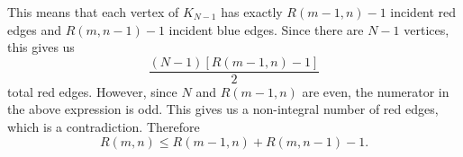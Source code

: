 \documentclass[12pt]{article}
\begin{document}
This means that each vertex of $K_{N-1}$ has exactly $R(m-1,n)-1$ incident red edges and $R(m,n-1)-1$ incident blue edges. Since there are $N-1$ vertices, this gives us
\[\frac{(N-1)[R(m-1,n)-1]}{2}\]
total red edges. However, since $N$ and $R(m-1,n)$ are even, the numerator in the above expression is odd. This gives us a non-integral number of red edges, which is a contradiction. Therefore
\[R(m,n) \leq R(m-1,n) + R(m,n-1) -1.\]
\end{document}

